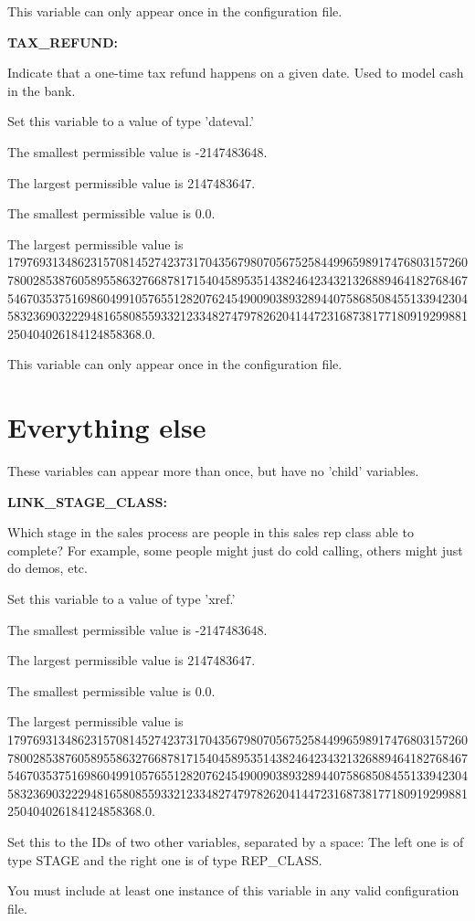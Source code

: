 This variable can only appear once in the configuration file.


\textbf{TAX\_REFUND:}


Indicate that a one-time tax refund happens on a given date.  Used to model cash in the bank.

Set this variable to a value of type 'dateval.'

The smallest permissible value is -2147483648.

The largest permissible value is 2147483647.

The smallest permissible value is 0.0.

The largest permissible value is 179769313486231570814527423731704356798070567525844996598917476803157260780028538760589558632766878171540458953514382464234321326889464182768467546703537516986049910576551282076245490090389328944075868508455133942304583236903222948165808559332123348274797826204144723168738177180919299881250404026184124858368.0.

This variable can only appear once in the configuration file.


\section{Everything else}


These variables can appear more than once, but have no 'child' variables.


\textbf{LINK\_STAGE\_CLASS:}


Which stage in the sales process are people in this sales rep class able to complete?  For example, some people might just do cold calling, others might just do demos, etc.

Set this variable to a value of type 'xref.'

The smallest permissible value is -2147483648.

The largest permissible value is 2147483647.

The smallest permissible value is 0.0.

The largest permissible value is 179769313486231570814527423731704356798070567525844996598917476803157260780028538760589558632766878171540458953514382464234321326889464182768467546703537516986049910576551282076245490090389328944075868508455133942304583236903222948165808559332123348274797826204144723168738177180919299881250404026184124858368.0.

Set this to the IDs of two other variables, separated by a space:  The left one is of type STAGE and the right one is of type REP\_CLASS.

You must include at least one instance of this variable in any valid configuration file.

\LastPage{}


